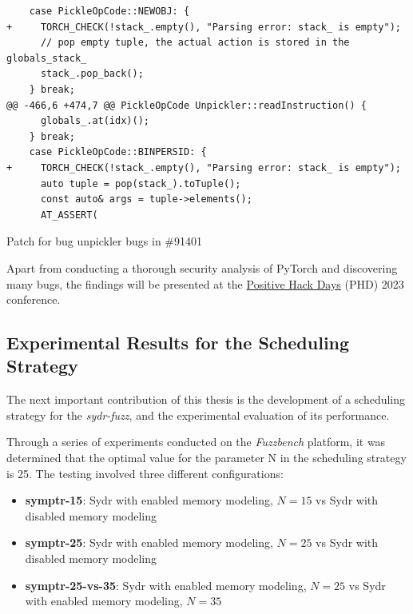 \begin{listing}
    \centering
    \begin{minipage}{0.9\linewidth}
        \begin{verbatim}
    case PickleOpCode::NEWOBJ: {
+     TORCH_CHECK(!stack_.empty(), "Parsing error: stack_ is empty");
      // pop empty tuple, the actual action is stored in the globals_stack_
      stack_.pop_back();
    } break;
@@ -466,6 +474,7 @@ PickleOpCode Unpickler::readInstruction() {
      globals_.at(idx)();
    } break;
    case PickleOpCode::BINPERSID: {
+     TORCH_CHECK(!stack_.empty(), "Parsing error: stack_ is empty");
      auto tuple = pop(stack_).toTuple();
      const auto& args = tuple->elements();
      AT_ASSERT(
    \end{verbatim}
    \end{minipage}
    \caption{Patch for bug unpickler bugs in \#91401}
    \label{listing:pytorch-bug-91401-patch}
\end{listing}

Apart from conducting a thorough security analysis of PyTorch and discovering many bugs, the findings will be presented at the \href{https://phdays.com/}{Positive Hack Days} (PHD) 2023 conference.

\subsection{Experimental Results for the Scheduling Strategy} \label{results:symbolic-pointers-modeling-scheduling}

The next important contribution of this thesis is the development of a scheduling strategy for the \textit{sydr-fuzz}, and the experimental evaluation of its performance.

Through a series of experiments conducted on the \textit{Fuzzbench} platform, it was determined that the optimal value for the parameter N in the scheduling strategy is 25. The testing involved three different configurations:

\begin{itemize}
    \item \textbf{symptr-15}: Sydr with enabled memory modeling, $N=15$ vs Sydr with disabled memory modeling
    \item \textbf{symptr-25}: Sydr with enabled memory modeling, $N=25$ vs Sydr with disabled memory modeling
    \item \textbf{symptr-25-vs-35}: Sydr with enabled memory modeling, $N=25$ vs Sydr with enabled memory modeling, $N=35$
\end{itemize}

